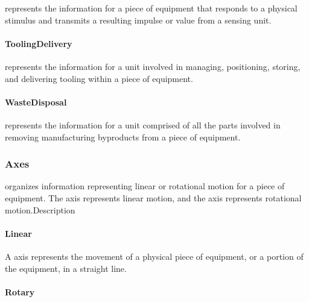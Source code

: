  represents the information for a piece of equipment that responds to a physical stimulus and transmits a resulting impulse or value from a sensing unit.


\paragraph{ToolingDelivery}\mbox{}
\label{sec:ToolingDelivery}



 represents the information for a unit involved in managing, positioning, storing, and delivering tooling within a piece of equipment.



\paragraph{WasteDisposal}\mbox{}
\label{sec:WasteDisposal}



 represents the information for a unit comprised of all the parts involved in removing manufacturing byproducts from a piece of equipment.



\subsubsection{Axes}
\label{sec:Axes}



 organizes information representing linear or rotational motion for a piece of equipment. The  axis  represents linear motion, and the axis  represents rotational motion.Description

\FloatBarrier

\paragraph{Linear}\mbox{}
\label{sec:Linear}



A  axis represents the movement of a physical piece of equipment, or a portion of the equipment, in a straight line. 


\paragraph{Rotary}\mbox{}
\label{sec:Rotary}



